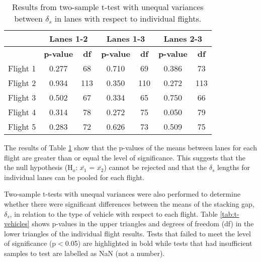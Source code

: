 \begin{table}[H]
\centering
\caption{Results from two-sample t-test with unequal variances between $\delta_{s}$ in lanes with respect to individual flights.}
\label{tab:ttest-lanes}
\begin{tabular}{@{}ccc|cc|cc@{}}
\toprule
 & \multicolumn{2}{c}{\textbf{Lanes 1-2}} & \multicolumn{2}{c}{\textbf{Lanes 1-3}} & \multicolumn{2}{c}{\textbf{Lanes 2-3}} \\ \midrule
 & \textbf{p-value} & \textbf{df} & \textbf{p-value} & \textbf{df} & \textbf{p-value} & \textbf{df} \\
Flight 1 & 0.277 & 68 & 0.710 & 69 & 0.386 & 73 \\
Flight 2 & 0.934 & 113 & 0.350 & 110 & 0.272 & 113 \\
Flight 3 & 0.502 & 67 & 0.334 & 65 & 0.750 & 66 \\
Flight 4 & 0.314 & 78 & 0.272 & 75 & 0.050 & 79 \\
Flight 5 & 0.283 & 72 & 0.626 & 73 & 0.509 & 75 \\ \bottomrule
\end{tabular}
\end{table}

The results of Table \ref{tab:ttest-lanes} show that the p-values of the means between lanes for each flight are greater than or equal the level of significance. This suggests that the the null hypothesis (H$_{o}$: $\bar{x_{1}}$ = $\bar{x_{2}}$) cannot be rejected and that the $\delta_{s}$ lengths for individual lanes can be pooled for each flight.

Two-sample t-tests with unequal variances were also performed to determine whether there were significant differences between the means of the stacking gap, $\delta_{s}$, in relation to the type of vehicle with respect to each flight. Table \ref{tab:t-vehicles} shows p-values in the upper triangles and degrees of freedom (df) in the lower triangles of the individual flight results. Tests that failed to meet the level of significance (p$<$0.05) are highlighted in bold while tests that had insufficient samples to test are labelled as NaN (not a number).

